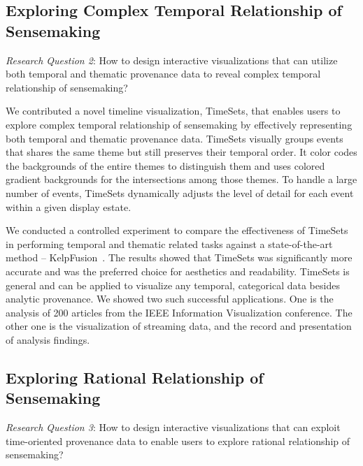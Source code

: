\subsection{Exploring Complex Temporal Relationship of Sensemaking}
\emph{Research Question 2}: How to design interactive visualizations that can utilize both temporal and thematic provenance data to reveal complex temporal relationship of sensemaking?

We contributed a novel timeline visualization, TimeSets, that enables users to explore complex temporal relationship of sensemaking by effectively representing both temporal and thematic provenance data. TimeSets visually groups events that shares the same theme but still preserves their temporal order. It color codes the backgrounds of the entire themes to distinguish them and uses colored gradient backgrounds for the intersections among those themes. To handle a large number of events, TimeSets dynamically adjusts the level of detail for each event within a given display estate. 

We conducted a controlled experiment to compare the effectiveness of TimeSets in performing temporal and thematic related tasks against a state-of-the-art method -- KelpFusion~\cite{Meulemans2013}. The results showed that TimeSets was significantly more accurate and was the preferred choice for aesthetics and readability. TimeSets is general and can be applied to visualize any temporal, categorical data besides analytic provenance. We showed two such successful applications. One is the analysis of 200 articles from the IEEE Information Visualization conference. The other one is the visualization of streaming data, and the record and presentation of analysis findings.

\subsection{Exploring Rational Relationship of Sensemaking}
\emph{Research Question 3}: How to design interactive visualizations that can exploit time-oriented provenance data to enable users to explore rational relationship of sensemaking?


